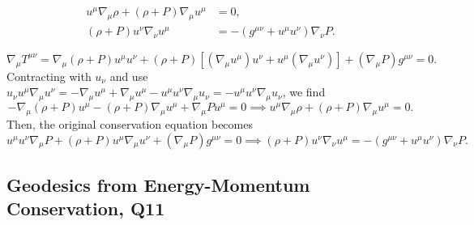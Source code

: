 \begin{enumerate}[label=\roman*)]
    \begin{align}
        u^\mu\nabla_\mu\rho + (\rho+P)\nabla_\mu u^\mu &= 0,\\
        (\rho+P)u^\nu\nabla_\nu u^\mu &= -(g^{\mu\nu}+u^\mu u^\nu)\nabla_\nu P.
    \end{align}
    \begin{solution}
        \begin{equation}
            \nabla_\mu T^{\mu\nu} = \nabla_\mu(\rho+P)u^\mu u^\nu + (\rho+P)[(\nabla_\mu u^\mu)u^\nu + u^\mu (\nabla_\mu u^\nu)] +(\nabla_\mu P)g^{\mu\nu} = 0.
        \end{equation}
        Contracting with $u_\nu$ and use $u_\nu u^\mu\nabla_\mu u^\nu = -\nabla_\mu u^\mu + \nabla_\mu u^\mu - u^\mu u^\nu \nabla_\mu u_\nu = - u^\mu u^\nu \nabla_\mu u_\nu$, we find
        \begin{equation}
            -\nabla_\mu(\rho+P) u^\mu -(\rho+P)\nabla_\mu u^\mu+ \nabla_\mu P u^\mu = 0 \implies u^\mu\nabla_\mu \rho + (\rho+P) \nabla_\mu u^\mu = 0.
        \end{equation}
        Then, the original conservation equation becomes
        \begin{equation}
            u^\mu u^\nu\nabla_\mu P + (\rho +P)u^\mu \nabla_\mu u^\nu  + (\nabla_\mu P)g^{\mu\nu}= 0\implies (\rho+P)u^\nu \nabla_\nu u^\mu = -(g^{\mu\nu}+u^\mu u^\nu)\nabla_\nu P.
        \end{equation}
    \end{solution}
\end{enumerate}

\subsection{Geodesics from Energy-Momentum Conservation, Q11}

